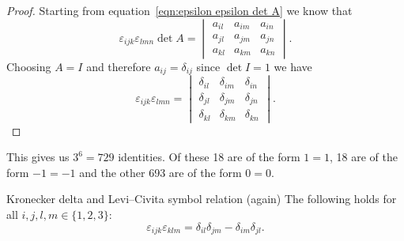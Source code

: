 \documentclass[a4paper]{article}
\begin{document}
    \begin{proof}
        Starting from equation~\ref{eqn:epsilon epsilon det A} we know that
        \[
            \varepsilon_{ijk}\varepsilon_{lmn}\det A = 
            \begin{vmatrix}
                a_{il} & a_{im} & a_{in}\\
                a_{jl} & a_{jm} & a_{jn}\\
                a_{kl} & a_{km} & a_{kn}
            \end{vmatrix}
            .
        \]
        Choosing \(A = I\) and therefore \(a_{ij} = \delta_{ij}\) since \(\det I = 1\) we have
        \[
            \varepsilon_{ijk}\varepsilon_{lmn} =
            \begin{vmatrix}
                \delta_{il} & \delta_{im} & \delta_{in}\\
                \delta_{jl} & \delta_{jm} & \delta_{jn}\\
                \delta_{kl} & \delta_{km} & \delta_{kn}
            \end{vmatrix}
            .
        \]
    \end{proof}
    This gives us \(3^6 = 729\) identities.
    Of these 18 are of the form \(1 = 1\), 18 are of the form \(-1 = -1\) and the other 693 are of the form \(0 = 0\).
    \begin{corollary}{Kronecker delta and Levi--Civita symbol relation (again)}{}
        The following holds for all \(i, j, l, m \in \{1, 2, 3\}\):
        \[\varepsilon_{ijk}\varepsilon_{klm} = \delta_{il}\delta_{jm} - \delta_{im}\delta_{jl}.\]
    \end{corollary}
\end{document}
